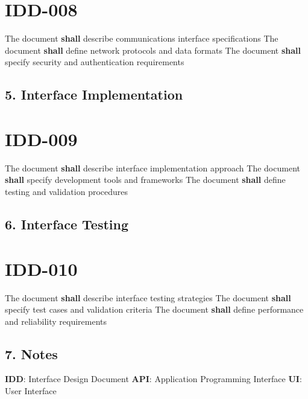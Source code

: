 \section{IDD-008}\label{IDD-008}

The document \textbf{shall} describe communications interface specifications
The document \textbf{shall} define network protocols and data formats
The document \textbf{shall} specify security and authentication requirements

\subsection{5. Interface Implementation}

\section{IDD-009}\label{IDD-009}

The document \textbf{shall} describe interface implementation approach
The document \textbf{shall} specify development tools and frameworks
The document \textbf{shall} define testing and validation procedures

\subsection{6. Interface Testing}

\section{IDD-010}\label{IDD-010}

The document \textbf{shall} describe interface testing strategies
The document \textbf{shall} specify test cases and validation criteria
The document \textbf{shall} define performance and reliability requirements

\subsection{7. Notes}
\textbf{IDD}: Interface Design Document
\textbf{API}: Application Programming Interface
\textbf{UI}: User Interface

